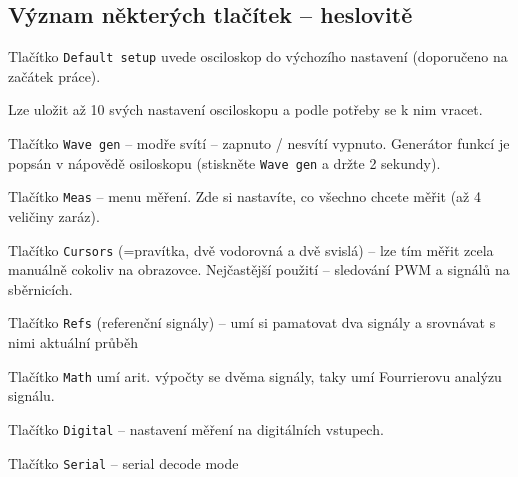 \subsection{Význam některých tlačítek -- heslovitě}

Tlačítko \texttt{Default setup} uvede osciloskop do výchozího nastavení (doporučeno na začátek práce).

Lze uložit až 10 svých nastavení osciloskopu a podle potřeby se k nim vracet.  %

 Tlačítko  \texttt{Wave  gen} -- modře svítí -- zapnuto / nesvítí vypnuto. 
 Generátor funkcí je popsán v nápovědě osiloskopu (stiskněte \texttt{Wave  gen} a držte 2 sekundy). 

 Tlačítko \texttt{Meas}  -- menu měření.
Zde si nastavíte, co všechno chcete měřit  (až 4 veličiny zaráz).

Tlačítko \texttt{Cursors}   (=pravítka, dvě vodorovná a dvě svislá)  -- lze tím měřit zcela manuálně cokoliv na obrazovce.
Nejčastější použití -- sledování PWM a signálů na sběrnicích. 

Tlačítko \texttt{Refs}  (referenční signály) -- umí si pamatovat dva signály a srovnávat s nimi aktuální průběh  %

Tlačítko \texttt{Math}  umí arit. výpočty se dvěma signály, taky umí Fourrierovu analýzu signálu. 

Tlačítko  \texttt{Digital} -- nastavení měření na digitálních vstupech.

Tlačítko   \texttt{Serial} -- serial decode mode  





%	
%	
%	
%	
%	
%	











